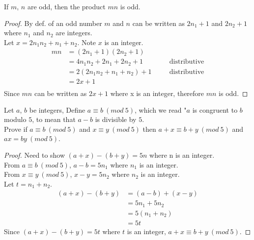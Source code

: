 \documentclass[6pt]{article}
\begin{document}
\begin{tcolorbox}[title=Problem 7, breakable]
If $m$, $n$ are odd, then the product $mn$ is odd.
\end{tcolorbox}

\begin{proof}
By def. of an odd number $m$ and $n$ can be written as $2n_1 + 1$ and $2n_2 + 1$ 
where $n_1$ and $n_2$ are integers. \\
Let $x = 2n_1 n_2 + n_1 + n_2$. Note $x$ is an integer.
\begin{align*}
mn &= (2n_1 + 1)(2n_2 + 1) && \\
&= 4 n_1 n_2 + 2 n_1 + 2 n_2 + 1 && \quad \text{distributive} \\
&= 2 (2n_1 n_2 + n_1 + n_2) + 1 && \quad \text{distributive} \\
&= 2 x + 1 && \quad \text{} \\
\end{align*}
Since $mn$ can be written as $2x + 1$ where x is an integer, therefore $mn$ is odd.
\end{proof}

\begin{tcolorbox}[title=Problem 24, breakable]
Let $a$, $b$ be integers, Define $a \equiv b\ (mod\ 5)$, which we read "$a$ is congruent
to $b$ modulo $5$, to mean that $a - b$ is divisible by $5$. \\
Prove if $a \equiv b\ (mod\ 5)$ and $x \equiv y\ (mod\ 5)$ then  $a + x \equiv b + y\ (mod\ 5)$
and $ax = by\ (mod\ 5)$.
\end{tcolorbox}

\begin{proof} 
Need to show $(a + x) - (b + y) = 5n$ where n is an integer. \\
From $a \equiv b\ (mod\ 5)$, $a - b = 5n_1$ where $n_1$ is an integer. \\
From $x \equiv y\ (mod\ 5)$, $x - y = 5n_2$ where $n_2$ is an integer. \\
Let $t = n_1 + n_2$.
\begin{align*}
(a + x) - (b + y) &= (a - b) + (x - y) \\
&= 5n_1 + 5n_2 \\
&= 5(n_1 + n_2) \\
&= 5t
\end{align*}
Since $(a + x) - (b + y) = 5t$ where $t$ is an integer, $a + x \equiv b + y\ (mod\ 5)$.
\end{proof}
\end{document}
